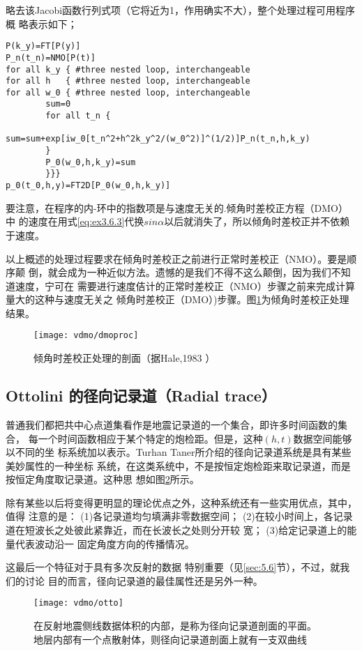 略去该Jacobi函数行列式项（它将近为1，作用确实不大），整个处理过程可用程序概
略表示如下；
\begin{verbatim}
P(k_y)=FT[P(y)]
P_n(t_n)=NMO[P(t)]
for all k_y { #three nested loop, interchangeable
for all h   { #three nested loop, interchangeable
for all w_0 { #three nested loop, interchangeable
        sum=0
        for all t_n {
          sum=sum+exp[iw_0[t_n^2+h^2k_y^2/(w_0^2)]^(1/2)]P_n(t_n,h,k_y)
        }
        P_0(w_0,h,k_y)=sum
        }}}
p_0(t_0,h,y)=FT2D[P_0(w_0,h,k_y)]
\end{verbatim}
要注意，在程序的内-环中的指数项是与速度无关的.倾角时差校正方程（DMO）中
的速度在用式\ref{eq:ex3.6.3}代换$sin\alpha$以后就消失了，所以倾角时差校正并不依赖于速度。

以上概述的处理过程要求在倾角时差校正之前进行正常时差校正（NMO）。要是顺序颠
倒，就会成为一种近似方法。遗憾的是我们不得不这么颠倒，因为我们不知道速度，宁可在
需要进行速度佶计的正常时差校正（NMO）步骤之前来完成计算量大的这种与速度无关之
倾角时差校正（DMO）)步骤。图\ref{fig:vdmo/dmoproc}为倾角时差校正处理结果。

\begin{figure}[H]
\centering
\texttt{[image: vdmo/dmoproc]}
\caption[dmoproc]{倾角时差校正处理的剖面（据Hale,1983
）}
\label{fig:vdmo/dmoproc}
\end{figure}

\subsection{Ottolini 的径向记录道（Radial trace）}
\label{sec:3.6.4}

普通我们都把共中心点道集看作是地震记录道的一个集合，即许多时间函数的集合，
每一个时间函数相应于某个特定的炮检距。但是，这种$(h,t)$数据空间能够以不同的坐
标系统加以表示。Turhan Taner所介绍的径向记录道系统是具有某些美妙属性的一种坐标
系统，在这类系统中，不是按恒定炮检距来取记录道，而是按恒定角度取记录道。这种思
想如图\ref{fig:vdmo/otto}所示。

除有某些以后将变得更明显的理论优点之外，这种系统还有一些实用优点，其中，值得
注意的是：
(1)各记录道均匀填满非零数据空间；
(2)在较小时间上，各记录道在短波长之处彼此紧靠近，而在长波长之处则分开较
宽；
(3)给定记录道上的能量代表波动沿一 固定角度方向的传播情况。

这最后一个特征对于具有多次反射的数据
特别重要（见\ref{sec:5.6}节），不过，就我们的讨论
目的而言，径向记录道的最佳属性还是另外一种。

\begin{figure}[H]
\centering
\texttt{[image: vdmo/otto]}
\caption[otto]{在反射地震侧线数据体积的内部，是称为径向记录道剖面的平面。
地层内部有一个点散射体，则径向记录道剖面上就有一支双曲线}
\label{fig:vdmo/otto}
\end{figure}

